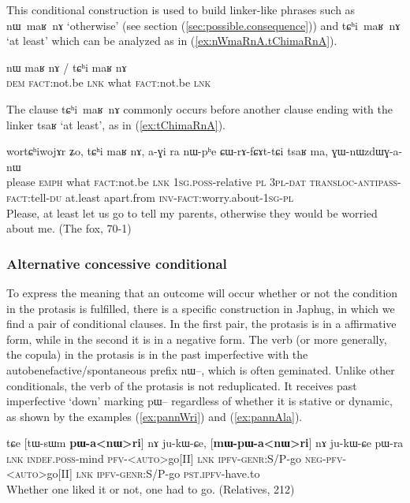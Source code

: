 \documentclass[oldfontcommands,oneside,a4paper,11pt]{article}
\newcommand{\ipa}[1]{{\phon \mbox{#1}}} %
\newcommand{\refb}[1]{(\ref{#1})}
\begin{document}
This conditional construction is used to build linker-like phrases such as \ipa{nɯ maʁ nɤ} `otherwise' (see section \refb{sec:possible.consequence}) and \ipa{tɕʰi maʁ nɤ} `at least' which can be analyzed as in \refb{ex:nWmaRnA.tChimaRnA}.
\begin{exe}
\ex  \label{ex:nWmaRnA.tChimaRnA}
\gll
 \ipa{nɯ} \ipa{maʁ} \ipa{nɤ} {              /            } \ipa{tɕʰi}  \ipa{maʁ} \ipa{nɤ} \\
 \textsc{dem} \textsc{fact}:not.be \textsc{lnk} { } what  \textsc{fact}:not.be \textsc{lnk}  \\
\end{exe}

The clause \ipa{tɕʰi maʁ nɤ} commonly occurs before another clause ending with the linker \ipa{tsaʁ} `at least', as in \refb{ex:tChimaRnA}.
\begin{exe}
\ex  \label{ex:tChimaRnA}
\gll
\ipa{wortɕʰiwojɤr} 	\ipa{ʑo,} 	\ipa{tɕʰi} 	\ipa{maʁ} 	\ipa{nɤ,} 	\ipa{a-ɣi} 	\ipa{ra} 	\ipa{nɯ-pʰe} 	\ipa{ɕɯ-rɤ-fɕɤt-tɕi} 	\ipa{tsaʁ} 	\ipa{ma,} 	\ipa{ɣɯ-nɯzdɯɣ-a-nɯ} 	 \\
please \textsc{emph} what \textsc{fact}:not.be \textsc{lnk} \textsc{1sg.poss}-relative \textsc{pl} \textsc{3pl-dat} \textsc{transloc-antipass-fact}:tell-\textsc{du} at.least  apart.from \textsc{inv}-\textsc{fact}:worry.about-\textsc{1sg-pl} \\
\glt Please, at least let us go to tell my parents, otherwise they would be worried about me. (The fox, 70-1)
\end{exe}

 
\subsubsection{Alternative concessive conditional}
To express the meaning that an outcome will occur whether or not the condition in the protasis is fulfilled, there is a specific construction in Japhug, in which we find a pair of conditional clauses. In the first pair, the protasis is in a affirmative form, while in the second it is in a negative form. The verb (or more generally, the copula) in the protasis  is in the past imperfective with the autobenefactive/spontaneous prefix \ipa{nɯ--}, which is often geminated. Unlike other conditionals, the verb of the protasis is not reduplicated. It receives past imperfective `down' marking \ipa{pɯ}-- regardless of whether it is stative or dynamic, as shown by the examples \refb{ex:pannWri} and \refb{ex:pannAla}.


\begin{exe}
\ex  \label{ex:pannWri}
\gll
\ipa{tɕe}  	[\ipa{tɯ-sɯm}  	\textbf{\ipa{pɯ-a<nɯ>ri}}]  	\ipa{nɤ}  	\ipa{ju-kɯ-ɕe,}  	[\textbf{\ipa{mɯ-pɯ-a<nɯ>ri}}]  	\ipa{nɤ}  	\ipa{ju-kɯ-ɕe}  	\ipa{pɯ-ra}  \\
\textsc{lnk} \textsc{indef.poss}-mind  \textsc{pfv-<auto>}go[II] \textsc{lnk} \textsc{ipfv-genr}:S/P-go \textsc{neg-pfv-<auto>}go[II] \textsc{lnk} \textsc{ipfv-genr}:S/P-go \textsc{pst.ipfv}-have.to \\
\glt Whether one liked it or not, one had to go. (Relatives, 212)
\end{exe}
\end{document}

